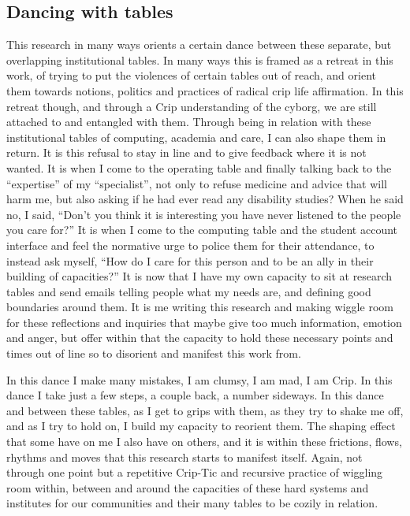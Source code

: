 \hypertarget{dancing-with-tables}{%
\subsection{Dancing with tables}\label{dancing-with-tables}}

This research in many ways orients a certain dance between these
separate, but overlapping institutional tables. In many ways this is
framed as a retreat in this work, of trying to put the violences of
certain tables out of reach, and orient them towards notions, politics
and practices of radical crip life affirmation. In this retreat though,
and through a Crip understanding of the cyborg, we are still attached to
and entangled with them. Through being in relation with these
institutional tables of computing, academia and care, I can also shape
them in return. It is this refusal to stay in line and to give feedback
where it is not wanted. It is when I come to the operating table and
finally talking back to the ``expertise'' of my ``specialist'', not only
to refuse medicine and advice that will harm me, but also asking if he
had ever read any disability studies? When he said no, I said, ``Don't
you think it is interesting you have never listened to the people you
care for?'' It is when I come to the computing table and the student
account interface and feel the normative urge to police them for their
attendance, to instead ask myself, ``How do I care for this person and
to be an ally in their building of capacities?'' It is now that I have
my own capacity to sit at research tables and send emails telling people
what my needs are, and defining good boundaries around them. It is me
writing this research and making wiggle room for these reflections and
inquiries that maybe give too much information, emotion and anger, but
offer within that the capacity to hold these necessary points and times
out of line so to disorient and manifest this work from.

In this dance I make many mistakes, I am clumsy, I am mad, I am Crip. In
this dance I take just a few steps, a couple back, a number sideways. In
this dance and between these tables, as I get to grips with them, as
they try to shake me off, and as I try to hold on, I build my capacity
to reorient them. The shaping effect that some have on me I also have on
others, and it is within these frictions, flows, rhythms and moves that
this research starts to manifest itself. Again, not through one point
but a repetitive Crip-Tic and recursive practice of wiggling room
within, between and around the capacities of these hard systems and
institutes for our communities and their many tables to be cozily in
relation.

